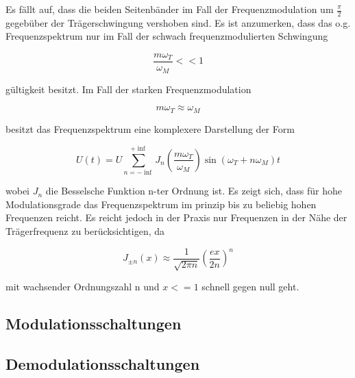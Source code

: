 Es fällt auf, dass die beiden Seitenbänder im Fall der Frequenzmodulation um $\frac{\pi}{2}$ gegebüber der Trägerschwingung vershoben sind. Es ist anzumerken, dass das o.g. Frequenzspektrum nur im Fall der schwach frequenzmodulierten Schwingung

\begin{equation}
\frac{m\omega_T}{\omega_M} << 1
\end{equation}

gültigkeit besitzt. Im Fall der starken Frequenzmodulation

\begin{equation}
m\omega_T \approx \omega_M
\end{equation}

besitzt das Frequenzspektrum eine komplexere Darstellung der Form

\begin{equation}
U(t) = U \sum_{n=-\inf}^{+\inf} J_{n}(\frac{m\omega_T}{\omega_M})\sin(\omega_T + n\omega_M)t 
\end{equation}

wobei $J_n$ die Besselsche Funktion n-ter Ordnung ist. Es zeigt sich, dass für hohe Modulationsgrade das Frequenzspektrum im prinzip bis zu beliebig hohen Frequenzen reicht. Es reicht jedoch in der Praxis nur Frequenzen in der Nähe der Trägerfrequenz zu berücksichtigen, da

\begin{equation}
J_{\pm n}(x) \approx \frac{1}{\sqrt{2\pi n}}(\frac{ex}{2n})^n
\end{equation}

mit wachsender Ordnungszahl n und $x <= 1$ schnell gegen null geht.

\subsection{Modulationsschaltungen}
\subsection{Demodulationsschaltungen}